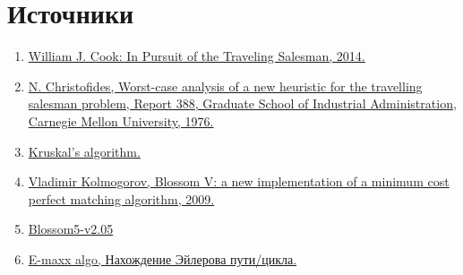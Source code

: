 \documentclass[A4, twocolumn]{article}
\begin{document}



\section{\textbf{Источники}}
\begin{enumerate}
	\item \label{book1} \href{https://press.princeton.edu/titles/9531.html}{William J. Cook: In Pursuit of the Traveling Salesman, 2014.}
	\item \label{algoChrist} \href{https://pdfs.semanticscholar.org/afcb/c048ba3265e04b32f92f9ffec0ff4a110aeb.pdf}{ N. Christofides, Worst-case analysis of a new heuristic for the travelling salesman problem, Report 388, Graduate School of Industrial Administration, Carnegie Mellon University, 1976.} 
	\item \label{Kruskal} \href{https://en.wikipedia.org/wiki/Kruskal\%27s_algorithm}{Kruskal's algorithm.}
	\item \label{kolm} \href{https://link.springer.com/content/pdf/10.1007\%2Fs12532-009-0002-8.pdf}{Vladimir Kolmogorov, Blossom V: a new implementation of a minimum cost perfect matching algorithm, 2009.}
	\item \label{realisation} \href{http://pub.ist.ac.at/~vnk/software/blossom5-v2.05.src.tar.gz}{Blossom5-v2.05}
	\item \label{euler} \href{http://e-maxx.ru/algo/euler_path}{E-maxx algo, Нахождение Эйлерова пути/цикла.}
\end{enumerate}

\end{document}
